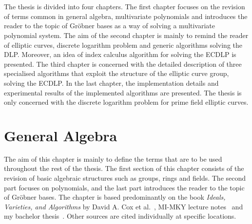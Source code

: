 \documentclass[thesis=M,english]{FITthesis}[2012/10/20]
\theoremstyle{remark}
\theoremstyle{definition}
\begin{document}
\\ \\
\noindent The thesis is divided into four chapters. The first chapter focuses on the revision of terms common in general algebra, multivariate polynomials and introduces the reader to the topic of Gröbner bases as a way of solving a multivariate polynomial system. The aim of the second chapter is mainly to remind the reader of elliptic curves, discrete logarithm problem and generic algorithms solving the DLP. Moreover, an idea of index calculus algorithm for solving the ECDLP is presented. The third chapter is concerned with the detailed description of three specialised algorithms that exploit the structure of the elliptic curve group, solving the ECDLP. In the last chapter, the implementation details and experimental results of the implemented algorithms are presented. The thesis is only concerned with the discrete logarithm problem for prime field elliptic curves.

\chapter{General Algebra}\label{mathBG}
%
The aim of this chapter is mainly to define the terms that are to be used throughout the rest of the thesis. The first section of this chapter consists of the revision of basic algebraic structures such as groups, rings and fields. The second part focuses on polynomials, and the last part introduces the reader to the topic of Gröbner bases. The chapter is based predominantly on the book \textit{Ideals, Varieties, and Algorithms} by David A. Cox et al.~\cite{algGeom}, MI-MKY lecture notes~\cite{mky} and my bachelor thesis~\cite{myBP}. Other sources are cited individually at specific locations.
\end{document}
